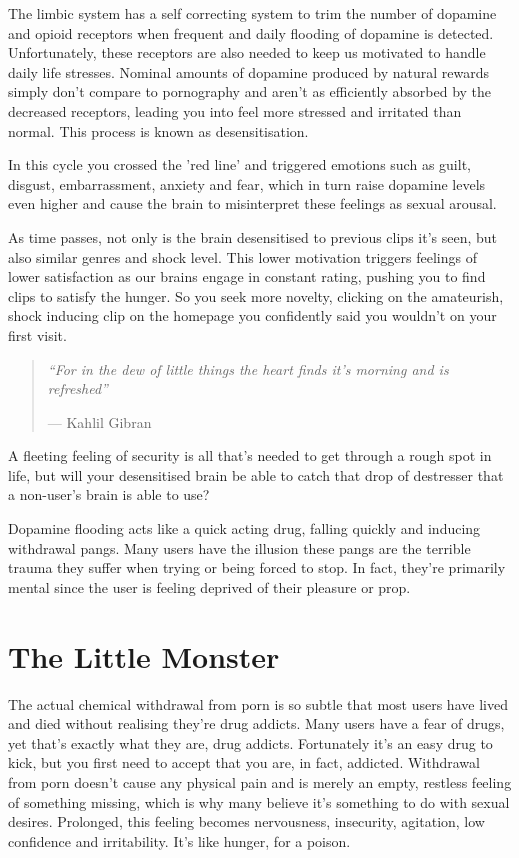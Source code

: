 \documentclass[
]{book}
\begin{document}
The limbic system has a self correcting system to trim the number of dopamine and opioid receptors when frequent and daily flooding of dopamine is detected. Unfortunately, these receptors are also needed to keep us motivated to handle daily life stresses. Nominal amounts of dopamine produced by natural rewards simply don't compare to pornography and aren't as efficiently absorbed by the decreased receptors, leading you into feel more stressed and irritated than normal. This process is known as desensitisation.

In this cycle you crossed the 'red line' and triggered emotions such as guilt, disgust, embarrassment, anxiety and fear, which in turn raise dopamine levels even higher and cause the brain to misinterpret these feelings as sexual arousal.

As time passes, not only is the brain desensitised to previous clips it's seen, but also similar genres and shock level. This lower motivation triggers feelings of lower satisfaction as our brains engage in constant rating, pushing you to find clips to satisfy the hunger. So you seek more novelty, clicking on the amateurish, shock inducing clip on the homepage you confidently said you wouldn't on your first visit.

\begin{quote}
\emph{``For in the dew of little things the heart finds it's morning and is refreshed''}

--- Kahlil Gibran
\end{quote}

A fleeting feeling of security is all that's needed to get through a rough spot in life, but will your desensitised brain be able to catch that drop of destresser that a non-user's brain is able to use?

Dopamine flooding acts like a quick acting drug, falling quickly and inducing withdrawal pangs. Many users have the illusion these pangs are the terrible trauma they suffer when trying or being forced to stop. In fact, they're primarily mental since the user is feeling deprived of their pleasure or prop.

\hypertarget{the-little-monster}{%
\section{The Little Monster}\label{the-little-monster}}

The actual chemical withdrawal from porn is so subtle that most users have lived and died without realising they're drug addicts. Many users have a fear of drugs, yet that's exactly what they are, drug addicts. Fortunately it's an easy drug to kick, but you first need to accept that you are, in fact, addicted. Withdrawal from porn doesn't cause any physical pain and is merely an empty, restless feeling of something missing, which is why many believe it's something to do with sexual desires. Prolonged, this feeling becomes nervousness, insecurity, agitation, low confidence and irritability. It's like hunger, for a poison.
\end{document}
